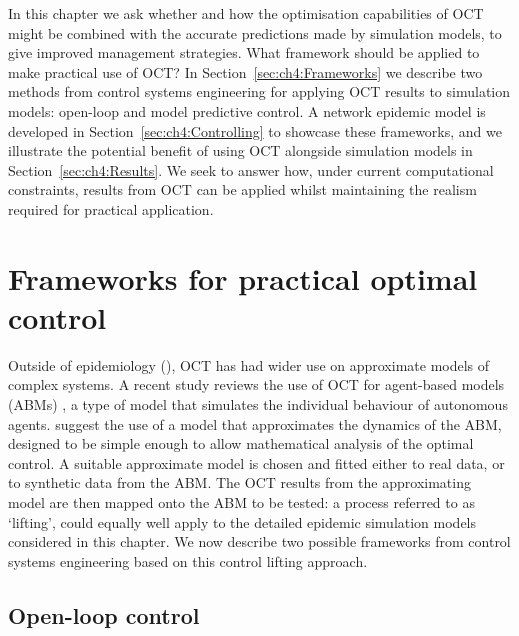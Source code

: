 In this chapter we ask whether and how the optimisation capabilities of OCT might be combined with the accurate predictions made by simulation models, to give improved management strategies. What framework should be applied to make practical use of OCT? In Section~\ref{sec:ch4:Frameworks} we describe two methods from control systems engineering for applying OCT results to simulation models: open-loop and model predictive control. A network epidemic model is developed in Section~\ref{sec:ch4:Controlling} to showcase these frameworks, and we illustrate the potential benefit of using OCT alongside simulation models in Section~\ref{sec:ch4:Results}. We seek to answer how, under current computational constraints, results from OCT can be applied whilst maintaining the realism required for practical application.


\section{Frameworks for practical optimal control\label{sec:ch4:Frameworks}}

Outside of epidemiology (), OCT has had wider use on approximate models of complex systems. A recent study reviews the use of OCT for agent-based models (ABMs) \citep{an_optimization_2017}, a type of model that simulates the individual behaviour of autonomous agents. \citet{an_optimization_2017} suggest the use of a model that approximates the dynamics of the ABM, designed to be simple enough to allow mathematical analysis of the optimal control. A suitable approximate model is chosen and fitted either to real data, or to synthetic data from the ABM\@. The OCT results from the approximating model are then mapped onto the ABM to be tested: a process referred to as `lifting',  could equally well apply to the detailed epidemic simulation models considered in this chapter. We now describe two possible frameworks from control systems engineering based on this control lifting approach.

\subsection*{Open-loop control}

